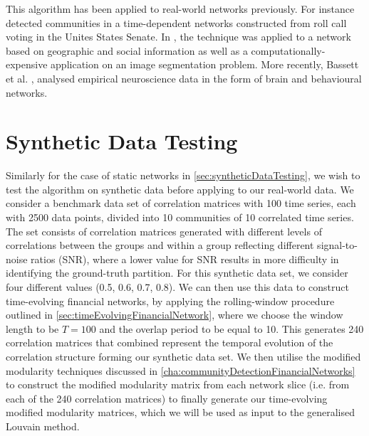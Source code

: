 This algorithm has been applied to real-world networks previously.
For instance \cite{MRM+10} detected communities in a time-dependent networks constructed from roll call voting in the Unites States Senate.
In \cite{HGH+12}, the technique was applied to a network based on geographic and social information as well as a computationally-expensive application on an image segmentation problem.
More recently, Bassett et al. \cite{BPW+13}, analysed empirical neuroscience data in the form of brain and behavioural networks.


\section{Synthetic Data Testing}
\label{sec:temporalEvolutionSyntheticDataTesting}

Similarly for the case of static networks in \cref{sec:syntheticDataTesting}, we wish to test the algorithm on synthetic data before applying to our real-world data.
We consider a benchmark data set of correlation matrices with 100 time series, each with 2500 data points, divided into 10 communities of 10 correlated time series.
The set consists of correlation matrices generated with different levels of correlations between the groups and within a group reflecting different signal-to-noise ratios (SNR), where a lower value for SNR results in more difficulty in identifying the ground-truth partition.
For this synthetic data set, we consider four different values (0.5, 0.6, 0.7, 0.8).
We can then use this data to construct time-evolving financial networks, by applying the rolling-window procedure outlined in \cref{sec:timeEvolvingFinancialNetwork}, where we choose the window length to be $T = 100$ and the overlap period to be equal to 10.
This generates 240 correlation matrices that combined represent the temporal evolution of the correlation structure forming our synthetic data set. 
We then utilise the modified modularity techniques discussed in \cref{cha:communityDetectionFinancialNetworks} to construct the modified modularity matrix from each network slice (i.e. from each of the 240 correlation matrices) to finally generate our time-evolving modified modularity matrices, which we will be used as input to the generalised Louvain method.

